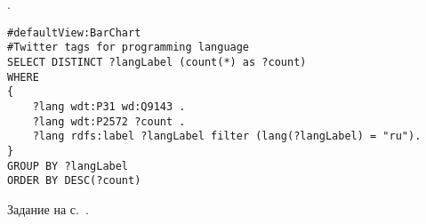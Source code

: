 \begin{task}
    \label{answer:prog_langs_6}
    . 
	\begin{lstlisting}[language=SPARQL, caption={{\href{https://w.wiki/v4h}{Хештеги языков программирования в Твиттере}}\protect\footnotemark}, label=lst:prog_lang_answer_6]
#defaultView:BarChart
#Twitter tags for programming language
SELECT DISTINCT ?langLabel (count(*) as ?count)
WHERE
{
    ?lang wdt:P31 wd:Q9143 .
    ?lang wdt:P2572 ?count .
    ?lang rdfs:label ?langLabel filter (lang(?langLabel) = "ru"). 
} 
GROUP BY ?langLabel
ORDER BY DESC(?count)
\end{lstlisting}
    
\small{Задание на с.~\pageref{prog_lang_test}.}
\end{task}





